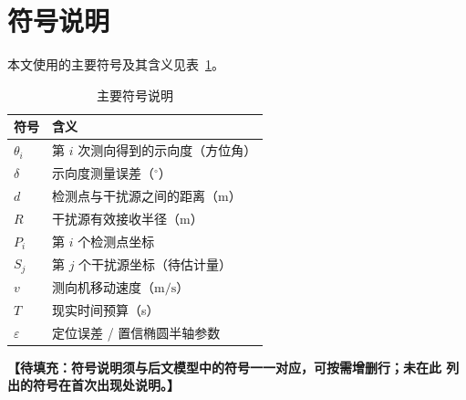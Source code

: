 \section{符号说明}
本文使用的主要符号及其含义见表~\ref{tab:symbol}。

\begin{table}[!htbp]
    \caption{主要符号说明}\label{tab:symbol}
    \centering
    \begin{tabular}{ll}
        \toprule
        符号 & 含义 \\
        \midrule
        $\theta_i$      & 第 $i$ 次测向得到的示向度（方位角） \\
        $\delta$        & 示向度测量误差（$^\circ$） \\
        $d$             & 检测点与干扰源之间的距离（m） \\
        $R$             & 干扰源有效接收半径（m） \\
        $P_i$           & 第 $i$ 个检测点坐标 \\
        $S_j$           & 第 $j$ 个干扰源坐标（待估计量） \\
        $v$             & 测向机移动速度（$\mathrm{m/s}$） \\
        $T$             & 现实时间预算（s） \\
        $\varepsilon$   & 定位误差 / 置信椭圆半轴参数 \\
        \bottomrule
    \end{tabular}
\end{table}

\textbf{【待填充：符号说明须与后文模型中的符号一一对应，可按需增删行；未在此
列出的符号在首次出现处说明。】}
